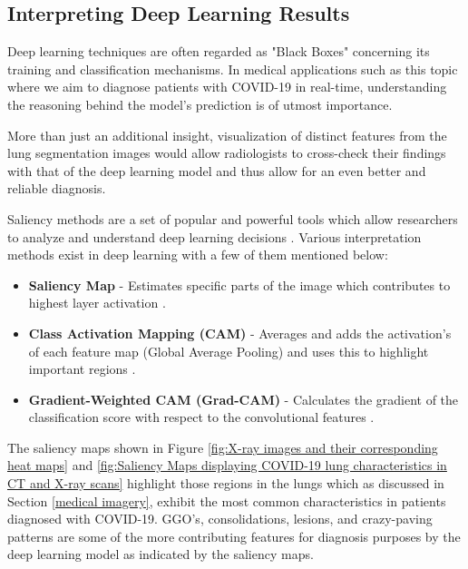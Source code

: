 \subsection{Interpreting Deep Learning Results}
\label{Interpreting Deep Learning Results}
Deep learning techniques are often regarded as "Black Boxes" concerning 
its training and classification mechanisms. In medical applications such as this topic where we 
aim to diagnose patients with COVID-19 in real-time, understanding the reasoning behind the model's prediction 
is of utmost importance. 

More than just an additional insight, visualization of distinct features 
from the lung segmentation images would allow radiologists to cross-check their findings with that of the deep 
learning model and thus allow for an even better and reliable diagnosis.

Saliency methods are a set of popular and powerful tools which allow researchers 
to analyze and understand deep learning decisions \cite{AGM+2018}. 
Various interpretation methods exist in deep learning with a few of them 
mentioned below:
\begin{itemize}
    \item \textbf{Saliency Map} - Estimates specific parts of the image which contributes to highest layer activation \cite{ZMF2013}.
    \item \textbf{Class Activation Mapping (CAM)} - Averages and adds the activation's of each feature map (Global Average Pooling) and uses this to highlight important regions \cite{ZKL+2015}.
    \item \textbf{Gradient-Weighted CAM (Grad-CAM)} - Calculates the gradient of the classification score with respect to the convolutional features \cite{RCD+2017}.
\end{itemize}

The saliency maps shown in Figure \ref{fig:X-ray images and their corresponding heat maps} and \ref{fig:Saliency Maps displaying COVID-19 lung characteristics in CT and X-ray scans} highlight those regions in the lungs 
which as discussed in Section \ref{medical imagery}, exhibit the most common characteristics 
in patients diagnosed with COVID-19. 
GGO's, consolidations, lesions, and crazy-paving patterns are some of the 
more contributing features for diagnosis purposes by the 
deep learning model as indicated by the saliency maps.

